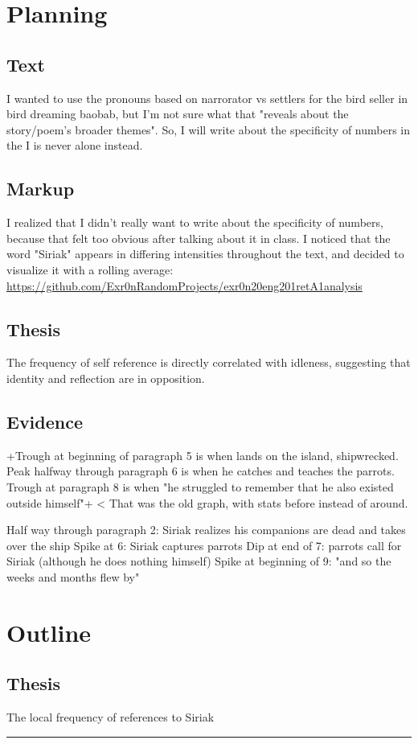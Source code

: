 \documentclass[letterpaper]{article}
\begin{document}
\section{Planning}
\label{sec:org083303a}
\subsection{Text}
\label{sec:orgc3bf2ed}
I wanted to use the pronouns based on narrorator vs settlers for the
bird seller in bird dreaming baobab, but I'm not sure what that "reveals
about the story/poem's broader themes". So, I will write about the
specificity of numbers in the I is never alone instead.

\subsection{Markup}
\label{sec:org78c987e}
I realized that I didn't really want to write about the specificity of
numbers, because that felt too obvious after talking about it in class.
I noticed that the word "Siriak" appears in differing intensities
throughout the text, and decided to visualize it with a rolling average:
\url{https://github.com/Exr0nRandomProjects/exr0n20eng201retA1analysis}

\subsection{Thesis}
\label{sec:orgb0e625e}
The frequency of self reference is directly correlated with idleness,
suggesting that identity and reflection are in opposition.

\subsection{Evidence}
\label{sec:org524f3b7}
+Trough at beginning of paragraph 5 is when lands on the island,
shipwrecked. Peak halfway through paragraph 6 is when he catches and
teaches the parrots. Trough at paragraph 8 is when "he struggled to
remember that he also existed outside himself"+ < That was the old
graph, with stats before instead of around.

Half way through paragraph 2: Siriak realizes his companions are dead
and takes over the ship Spike at 6: Siriak captures parrots Dip at end
of 7: parrots call for Siriak (although he does nothing himself) Spike
at beginning of 9: "and so the weeks and months flew by"

\section{Outline}
\label{sec:orgbcf6fd7}
\subsection{Thesis}
\label{sec:org9ede9e7}
The local frequency of references to Siriak

\noindent\rule{\textwidth}{0.5pt}
\end{document}
